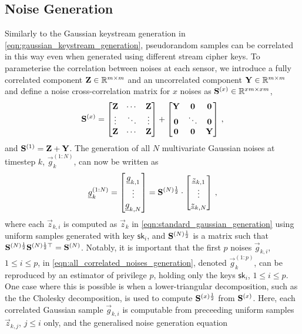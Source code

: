 \documentclass[conference]{IEEEtran}
\theoremstyle{definition}
\theoremstyle{remark}
\begin{document}
\subsection{Noise Generation}\label{subsec:noise_gen}
Similarly to the Gaussian keystream generation in \eqref{eqn:gaussian_keystream_generation}, pseudorandom samples can be correlated in this way even when generated using different stream cipher keys. To parameterise the correlation between noises at each sensor, we introduce a fully correlated component ${{\mathbf{Z}}}\in\mathbb{R}^{m\times m}$ and an uncorrelated component ${{\mathbf{Y}}}\in\mathbb{R}^{m\times m}$ and define a noise cross-correlation matrix for $x$ noises as ${{\mathbf{S}}}^{(x)} \in \mathbb{R}^{xm\times xm}$,
\begin{equation}\label{eqn:noise_correlation_matrix}
  \mat{S}^{(x)}=
  \begin{bmatrix}
    \mat{Z} & \cdots & \mat{Z}\\
    \vdots & \ddots & \vdots\\
    \mat{Z} & \cdots & \mat{Z}\\
  \end{bmatrix}+
  \begin{bmatrix}
    \mat{Y} & \mat{0} & \mat{0}\\
    \mat{0} & \ddots & \mat{0}\\
    \mat{0} & \mat{0} & \mat{Y}\\
  \end{bmatrix}\,,
\end{equation}
and ${{\mathbf{S}}}^{(1)}={{\mathbf{Z}}}+{{\mathbf{Y}}}$. The generation of all $N$ multivariate Gaussian noises at timestep $k$, $\vec{g}_k^{(1:N)}$, can now be written as
\begin{equation}\label{eqn:all_correlated_noises_generation}
  \vec{g}_k^{(1:N)}=
  \begin{bmatrix}
    \vec{g}_{k,1}\\
    \vdots\\
    \vec{g}_{k,N}
  \end{bmatrix}=
  \mat{S}^{(N)\frac{1}{2}}\cdot
  \begin{bmatrix}
    \vec{z}_{k,1}\\
    \vdots\\
    \vec{z}_{k,N}
  \end{bmatrix}\,,
\end{equation}
where each $\vec{z}_{k,i}$ is computed as $\vec{z}_k$ in \eqref{eqn:standard_gaussian_generation} using uniform samples generated with key $\mathsf{sk}_i$, and ${{\mathbf{S}}}^{(N)\frac{1}{2}}$ is a matrix such that ${{\mathbf{S}}}^{(N)\frac{1}{2}}{{\mathbf{S}}}^{(N)\frac{1}{2}\top}={{\mathbf{S}}}^{(N)}$. Notably, it is important that the first $p$ noises $\vec{g}_{k,i}$, $1\leq i \leq p$, in \eqref{eqn:all_correlated_noises_generation}, denoted $\vec{g}_k^{(1:p)}$, can be reproduced by an estimator of privilege $p$, holding only the keys $\mathsf{sk}_i$, $1\leq i \leq p$. One case where this is possible is when a lower-triangular decomposition, such as the the Cholesky decomposition, is used to compute ${{\mathbf{S}}}^{(x)\frac{1}{2}}$ from ${{\mathbf{S}}}^{(x)}$. Here, each correlated Gaussian sample $\vec{g}_{k,i}$ is computable from preceeding uniform samples $\vec{z}_{k,j}$, $j\leq i$ only, and the generalised noise generation equation
\end{document}
